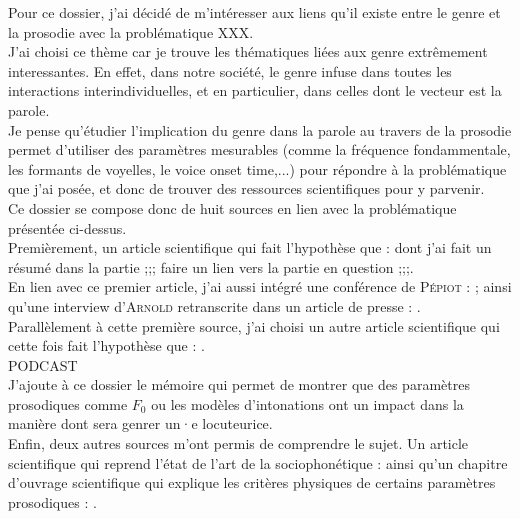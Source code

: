 Pour ce dossier, j'ai décidé de m'intéresser aux liens qu'il existe entre le genre et la prosodie avec la problématique XXX. \\
J'ai choisi ce thème car je trouve les thématiques liées aux genre extrêmement interessantes.
En effet, dans notre société, le genre infuse dans toutes les interactions interindividuelles, et en particulier, dans celles dont le vecteur est la parole. \\
Je pense qu'étudier l'implication du genre dans la parole au travers de la prosodie permet d'utiliser des paramètres mesurables (comme la fréquence fondammentale, les formants de voyelles, le voice onset time,...) pour répondre à la problématique que j'ai posée, et donc de trouver des ressources scientifiques pour y parvenir.\\

Ce dossier se compose donc de huit sources en lien avec la problématique présentée ci-dessus.\\
Premièrement, un article scientifique qui fait l'hypothèse que  : \cite{Pep20} dont j'ai fait un résumé dans la partie ;;; faire un lien vers la partie en question ;;;.\\
En lien avec ce premier article, j'ai aussi intégré une conférence de \textsc{Pépiot} : \cite{Pep16}; ainsi qu'une interview d'\textsc{Arnold} retranscrite dans un article de presse : \cite{Bro18}.\\
Parallèlement à cette première source, j'ai choisi un autre article scientifique qui cette fois fait l'hypothèse que  : \cite{Boe75}.\\
PODCAST\\
J'ajoute à ce dossier le mémoire \cite{Gar22} qui permet de montrer que des paramètres prosodiques comme $F_0$ ou les modèles d'intonations ont un impact dans la manière dont sera genrer un·e locuteurice.\\
Enfin, deux autres sources m'ont permis de comprendre le sujet. Un article scientifique qui reprend l'état de l'art de la sociophonétique : \cite{Can18} ainsi qu'un chapitre d'ouvrage scientifique qui explique les critères physiques de certains paramètres prosodiques : \cite{DiC13}.\\
